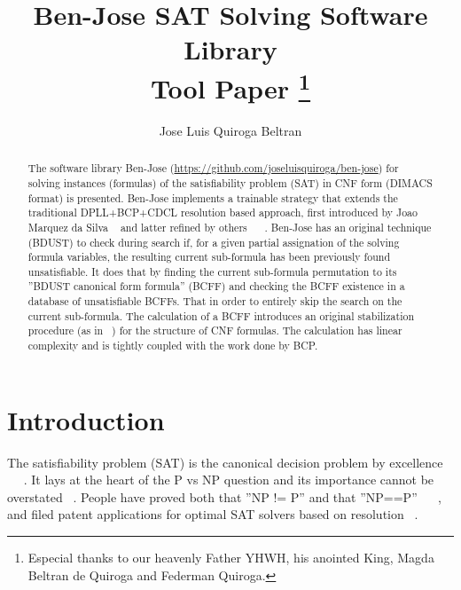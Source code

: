 \documentclass{easychair}
\title{Ben-Jose SAT Solving Software Library\\
       Tool Paper%
\thanks{Especial thanks to our heavenly Father YHWH, his anointed King, Magda Beltran de Quiroga and Federman Quiroga.}}
\author{
Jose Luis Quiroga Beltran
}
\institute{
	Independent Researcher\\
	\email{joseluisquiroga@yahoo.com}\\
	March 2016
 }
\begin{document}
\maketitle

\begin{abstract}
The software library Ben-Jose (\url{https://github.com/joseluisquiroga/ben-jose}) for solving instances (formulas) of the satisfiability problem (SAT) in CNF form (DIMACS format) is presented. Ben-Jose implements a trainable strategy that extends the traditional DPLL+BCP+CDCL resolution based approach, first introduced by Joao Marquez da Silva ~\cite{silva-95} and latter refined by others ~\cite{moskewicz-01} ~\cite{een-04}. Ben-Jose has an original technique (BDUST) to check during search if, for a given partial assignation of the solving formula variables, the resulting current sub-formula has been previously found unsatisfiable. It does that by finding the current sub-formula permutation to its ''BDUST canonical form formula'' (BCFF) and checking the BCFF existence in a database of unsatisfiable BCFFs. That in order to entirely skip the search on the current sub-formula. The calculation of a BCFF introduces an original stabilization procedure (as in ~\cite{bastert-02}) for the structure of CNF formulas. The calculation has linear complexity and is tightly coupled with the work done by BCP.
\end{abstract}


\setcounter{tocdepth}{2}
{\small
\tableofcontents}

%
%

\pagestyle{empty}

\section{Introduction}
\label{sect:introduction}

The satisfiability problem (SAT) is the canonical decision problem by excellence ~\cite{biere-09} ~\cite{kroening-08} ~\cite{marek-09}. It lays at the heart of the P vs NP question and its importance cannot be overstated ~\cite{cook-09}. People have proved both that ''NP != P'' and that ''NP==P'' ~\cite{woeginger-16} ~\cite{muller-13}, and filed patent applications for optimal SAT solvers based on resolution ~\cite{quiroga-01}. 
\end{document}
